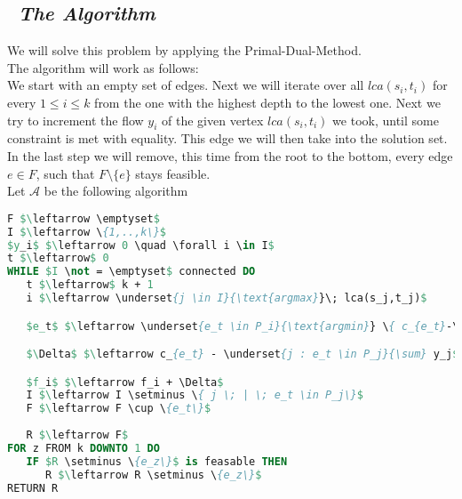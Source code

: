 \subsection*{\itshape~The Algorithm}

We will solve this problem by applying the Primal-Dual-Method.\\

The algorithm will work as follows:\\
We start with an empty set of edges. Next we will iterate over all $lca(s_i,t_i)$ for every $1 \leq i \leq k$
from the one with the highest depth to the lowest one. Next we try to increment the flow $y_i$
of the given vertex $lca(s_i,t_i)$ we took, until some constraint is met with equality. This edge
we will then take into the solution set. In the last step we will remove, this time from the root to the
bottom, every edge $e \in F$, such that $F \setminus \{e\}$ stays feasible.\\

Let $\mathcal{A}$ be the following algorithm\\

\begin{lstlisting}[language=Pascal]
F $\leftarrow \emptyset$
I $\leftarrow \{1,..,k\}$
$y_i$ $\leftarrow 0 \quad \forall i \in I$
t $\leftarrow$ 0
WHILE $I \not = \emptyset$ connected DO
   t $\leftarrow$ k + 1
   i $\leftarrow \underset{j \in I}{\text{argmax}}\; lca(s_j,t_j)$

   $e_t$ $\leftarrow \underset{e_t \in P_i}{\text{argmin}} \{ c_{e_t}-\underset{j:e_t\in P_j}{\sum} y_j\}$

   $\Delta$ $\leftarrow c_{e_t} - \underset{j : e_t \in P_j}{\sum} y_j$

   $f_i$ $\leftarrow f_i + \Delta$
   I $\leftarrow I \setminus \{ j \; | \; e_t \in P_j\}$
   F $\leftarrow F \cup \{e_t\}$
   
   R $\leftarrow F$
FOR z FROM k DOWNTO 1 DO
   IF $R \setminus \{e_z\}$ is feasable THEN
      R $\leftarrow R \setminus \{e_z\}$
RETURN R
\end{lstlisting}
